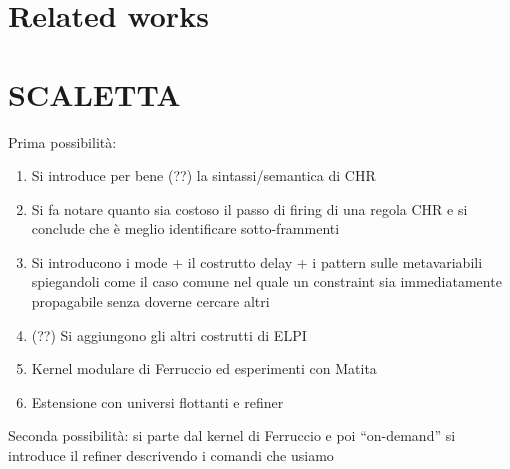 \documentclass{easychair}
\begin{document}
\section{Related works}

\section{SCALETTA}

Prima possibilità:
\begin{enumerate}
\item Si introduce per bene (??) la sintassi/semantica di CHR
\item Si fa notare quanto sia costoso il passo di firing di una regola CHR
      e si conclude che è meglio identificare sotto-frammenti
\item Si introducono i mode + il costrutto delay + i pattern sulle metavariabili
      spiegandoli come il caso comune nel quale un constraint sia immediatamente
      propagabile senza doverne cercare altri
\item (??) Si aggiungono gli altri costrutti di ELPI
\item Kernel modulare di Ferruccio ed esperimenti con Matita
\item Estensione con universi flottanti e refiner
\end{enumerate}

Seconda possibilità: si parte dal kernel di Ferruccio e poi ``on-demand'' si introduce il refiner descrivendo i comandi che usiamo 

\label{sect:bib}


\end{document}

